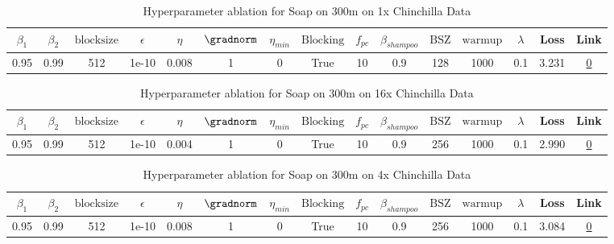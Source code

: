 \begin{table}[H]
\centering
\caption{Hyperparameter ablation for Soap on 300m on 1x Chinchilla Data}
\label{tab:ablation_soap_300m_1}
\begin{tabular}{ccccccccccccccc}
\toprule
$\beta_1$ & $\beta_2$ & $\mathrm{block size}$ & $\epsilon$ & $\eta$ & $\gradnorm$ & $\eta_{min}$ & $\mathrm{Blocking}$ & $f_{pc}$ & $\beta_{shampoo}$ & $\mathrm{BSZ}$ & $\mathrm{warmup}$ & $\lambda$ & Loss & Link \\
\midrule
0.95 & 0.99 & 512 & 1e-10 & 0.008 & 1 & 0 & True & 10 & 0.9 & 128 & 1000 & 0.1 & 3.231 & \href{https://wandb.ai/stanford-mercury/optimizer-scaling/runs/sweep-300m-6B-soape63ad3blr0.008-wd0.1-minlr0-warmup1000-b10.95--02f063}{0} \\
\midrule
\bottomrule
\end{tabular}
\end{table}

\begin{table}[H]
\centering
\caption{Hyperparameter ablation for Soap on 300m on 16x Chinchilla Data}
\label{tab:ablation_soap_300m_16}
\begin{tabular}{ccccccccccccccc}
\toprule
$\beta_1$ & $\beta_2$ & $\mathrm{block size}$ & $\epsilon$ & $\eta$ & $\gradnorm$ & $\eta_{min}$ & $\mathrm{Blocking}$ & $f_{pc}$ & $\beta_{shampoo}$ & $\mathrm{BSZ}$ & $\mathrm{warmup}$ & $\lambda$ & Loss & Link \\
\midrule
0.95 & 0.99 & 512 & 1e-10 & 0.004 & 1 & 0 & True & 10 & 0.9 & 256 & 1000 & 0.1 & 2.990 & \href{https://wandb.ai/stanford-mercury/optimizer-scaling/runs/sweep-300m-96B-soapef479bb0lr0.004-wd0.1-minlr0-warmup1000-b10.9-ef8190}{0} \\
\midrule
\bottomrule
\end{tabular}
\end{table}

\begin{table}[H]
\centering
\caption{Hyperparameter ablation for Soap on 300m on 4x Chinchilla Data}
\label{tab:ablation_soap_300m_4}
\begin{tabular}{ccccccccccccccc}
\toprule
$\beta_1$ & $\beta_2$ & $\mathrm{block size}$ & $\epsilon$ & $\eta$ & $\gradnorm$ & $\eta_{min}$ & $\mathrm{Blocking}$ & $f_{pc}$ & $\beta_{shampoo}$ & $\mathrm{BSZ}$ & $\mathrm{warmup}$ & $\lambda$ & Loss & Link \\
\midrule
0.95 & 0.99 & 512 & 1e-10 & 0.008 & 1 & 0 & True & 10 & 0.9 & 256 & 1000 & 0.1 & 3.084 & \href{https://wandb.ai/stanford-mercury/optimizer-scaling/runs/sweep-300m-24B-soapeie4b166lr0.008-wd0.1-minlr0-warmup1000-b10.9-9894a6}{0} \\
\midrule
\bottomrule
\end{tabular}
\end{table}

